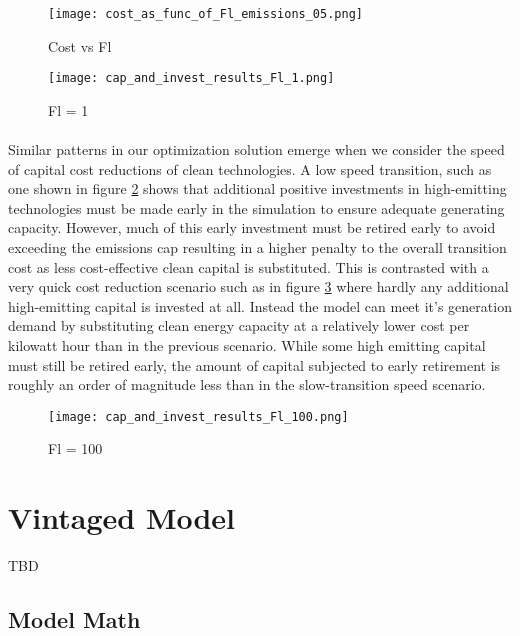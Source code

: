 \documentclass[singlespace]{easychithesis}
\begin{document}
\begin{figure}[h]
\texttt{[image: cost\_as\_func\_of\_Fl\_emissions\_05.png]}
\caption{Cost vs Fl\label{fig:costVsFl}}
\end{figure}


\begin{figure}[h]
\texttt{[image: cap\_and\_invest\_results\_Fl\_1.png]}
\caption{Fl = 1\label{fig:SimpleResultsFl=1}}
\end{figure}

\paragraph{} Similar patterns in our optimization solution emerge when we consider the speed of capital cost reductions of clean technologies. A low speed transition, such as one shown in figure \ref{fig:SimpleResultsFl=1} shows that additional positive investments in high-emitting technologies must be made early in the simulation to ensure adequate generating capacity. However, much of this early investment must be retired early to avoid exceeding the emissions cap resulting in a higher penalty to the overall transition cost as less cost-effective clean capital is substituted. This is contrasted with a very quick cost reduction scenario such as in figure \ref{fig:SimpleResultsFl=100} where hardly any additional high-emitting capital is invested at all. Instead the model can meet it's generation demand by substituting clean energy capacity at a relatively lower cost per kilowatt hour than in the previous scenario. While some high emitting capital must still be retired early, the amount of capital subjected to early retirement is roughly an order of magnitude less than in the slow-transition speed scenario. 

\begin{figure}[h]
\texttt{[image: cap\_and\_invest\_results\_Fl\_100.png]}
\caption{Fl = 100\label{fig:SimpleResultsFl=100}}
\end{figure}



\FloatBarrier

\section{Vintaged Model}

TBD


\subsection{Model Math}
\end{document}
